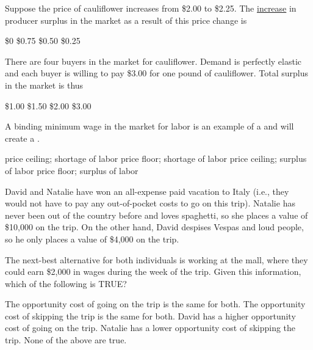 \documentclass[addpoints,11pt]{exam}
\theoremstyle{definition}
\newcommand{\blank}[0]{\underline{\hspace{3cm}}}
\begin{document}
\begin{questions}
\begin{table}[H]
\end{table} 

\question \label{qblerg} Suppose the price of cauliflower increases from \$2.00 to \$2.25. The \underline{increase} in producer surplus in the market as a result of this price change is 

\begin{choices}
	\choice \$0
	\choice \$0.75
	\choice \$0.50
	\CorrectChoice \$0.25
\end{choices}

\question \label{qblerg2} There are four buyers in the market for cauliflower. Demand is perfectly elastic and each buyer is willing to pay \$3.00 for one pound of cauliflower. Total surplus in the market is thus

\begin{choices}
	\choice \$1.00
	\choice \$1.50
	\choice \$2.00
	\CorrectChoice \$3.00
\end{choices}

\newpage

\question A binding minimum wage in the market for labor is an example of a \blank and will create a \blank.

\begin{choices}
	\choice price ceiling; shortage of labor
	\choice price floor; shortage of labor
	\choice price ceiling; surplus of labor
	\CorrectChoice price floor; surplus of labor
\end{choices}

\question David and Natalie have won an all-expense paid vacation to Italy (i.e., they would not have to pay any out-of-pocket costs to go on this trip). Natalie has never been out of the country before and loves spaghetti, so she places a value of \$10,000 on the trip. On the other hand, David despises Vespas and loud people, so he only places a value of \$4,000 on the trip. 

The next-best alternative for both individuals is working at the mall, where they could earn \$2,000 in wages during the week of the trip. Given this information, which of the following is TRUE?

\begin{choices}
	\CorrectChoice The opportunity cost of going on the trip is the same for both.
	\choice The opportunity cost of skipping the trip is the same for both.
	\choice David has a higher opportunity cost of going on the trip.
	\choice Natalie has a lower opportunity cost of skipping the trip.
	\choice None of the above are true.
\end{choices}


\end{questions}
\end{document}
